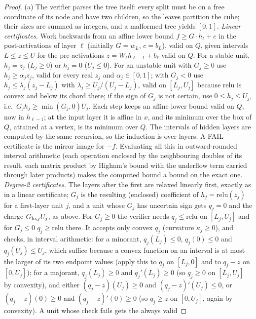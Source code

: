 \begin{proof}
(a) The verifier parses the tree itself: every split must be on a free coordinate of
its node and have two children, so the leaves partition the cube; their sizes are
summed as integers, and a malformed tree yields $[0,1]$. \emph{Linear certificates.}
Work backwards from an affine lower bound $f\ge G\cdot h_\ell+c$ in the post-activations
of layer $\ell$ (initially $G=w_L$, $c=b_L$), valid on $Q$, given intervals
$L\le z\le U$ for the pre-activations $z=W_\ell h_{\ell-1}+b_\ell$ valid on $Q$. For a
stable unit, $h_j=z_j$ ($L_j\ge0$) or $h_j=0$ ($U_j\le0$). For an unstable unit with
$G_j\ge0$ use $h_j\ge\alpha_jz_j$, valid for every real $z_j$ and $\alpha_j\in[0,1]$; with
$G_j<0$ use $h_j\le\lambda_j(z_j-L_j)$ with $\lambda_j\ge U_j/(U_j-L_j)$, valid on $[L_j,U_j]$
because $\mathrm{relu}$ is convex and below its chord there; if the sign of $G_j$ is not
certain, use $0\le h_j\le U_j$, i.e.\ $G_jh_j\ge\min(G_j,0)U_j$. Each step keeps an
affine lower bound valid on $Q$, now in $h_{\ell-1}$; at the input layer it is affine in
$x$, and its minimum over the box of $Q$, attained at a vertex, is its minimum over $Q$.
The intervals of hidden layers are computed by the same recursion, so the induction is
over layers. A FAIL certificate is the mirror image for $-f$. Evaluating all this in
outward-rounded interval arithmetic (each operation enclosed by the neighbouring doubles
of its result, each matrix product by Higham's bound with the underflow term carried
through later products) makes the computed bound a bound on the exact one.
\emph{Degree-2 certificates.} The layers after the first are relaxed linearly first,
exactly as in a linear certificate; $G_j$ is the resulting (enclosed) coefficient of
$h_j=\mathrm{relu}(z_j)$ for a first-layer unit $j$, and a unit whose $G_j$ has
uncertain sign gets $q_j=0$ and the charge $G_{{\rm lo},j}U_j$, as above. For
$G_j\ge0$ the verifier needs $q_j\le\mathrm{relu}$ on $[L_j,U_j]$ and for $G_j\le0$
$q_j\ge\mathrm{relu}$ there. It accepts only convex $q_j$ (curvature $\kappa_j\ge0$),
and checks, in interval arithmetic: for a minorant, $q_j(L_j)\le0$, $q_j(0)\le0$ and
$q_j(U_j)\le U_j$, which suffice because a convex function on an interval is at most
the larger of its two endpoint values (apply this to $q_j$ on $[L_j,0]$ and to $q_j-z$
on $[0,U_j]$); for a majorant, $q_j(L_j)\ge0$ and $q_j'(L_j)\ge0$ (so
$q_j\ge0$ on $[L_j,U_j]$ by convexity), and either $(q_j-z)(U_j)\ge0$ and
$(q_j-z)'(U_j)\le0$, or $(q_j-z)(0)\ge0$ and $(q_j-z)'(0)\ge0$ (so $q_j\ge z$ on
$[0,U_j]$, again by convexity). A unit whose check fails gets the always valid

\end{proof}
